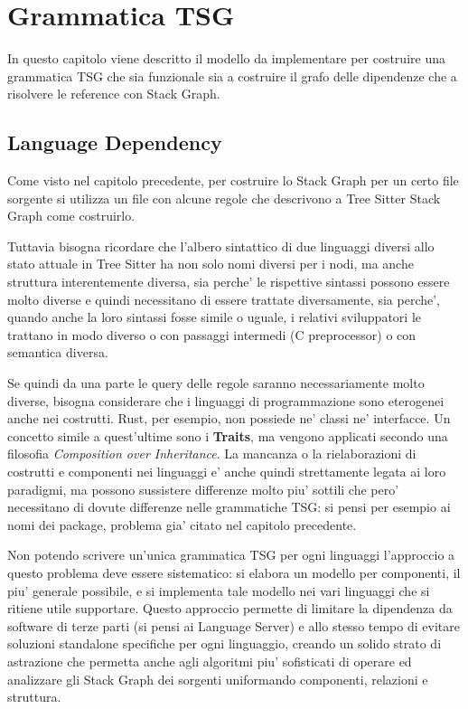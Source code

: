\chapter{Grammatica TSG}

In questo capitolo viene descritto il modello da implementare per costruire una grammatica TSG che sia funzionale sia a costruire il grafo delle dipendenze che a risolvere le reference con Stack Graph.

\section{Language Dependency}

Come visto nel capitolo precedente, per costruire lo Stack Graph per un certo file sorgente si utilizza un file con alcune regole che descrivono a Tree Sitter Stack Graph come costruirlo.

\par
Tuttavia bisogna ricordare che l'albero sintattico di due linguaggi diversi allo stato attuale in Tree Sitter ha non solo nomi diversi per i nodi, ma anche struttura interentemente diversa, sia perche' le rispettive sintassi possono essere molto diverse e quindi necessitano di essere trattate diversamente, sia perche', quando anche la loro sintassi fosse simile o uguale, i relativi sviluppatori le trattano in modo diverso o con passaggi intermedi (C preprocessor) o con semantica diversa.

\par
Se quindi da una parte le query delle regole saranno necessariamente molto diverse, bisogna considerare che i linguaggi di programmazione sono eterogenei anche nei costrutti.
Rust, per esempio, non possiede ne' classi ne' interfacce. Un concetto simile a quest'ultime sono i \textbf{Traits}, ma vengono applicati secondo una filosofia \emph{Composition over Inheritance}.
La mancanza o la rielaborazioni di costrutti e componenti nei linguaggi e' anche quindi strettamente legata ai loro paradigmi, ma possono sussistere differenze molto piu' sottili che pero' necessitano di dovute differenze nelle grammatiche TSG: si pensi per esempio ai nomi dei package, problema gia' citato nel capitolo precedente.

\par
Non potendo scrivere un'unica grammatica TSG per ogni linguaggi l'approccio a questo problema deve essere sistematico: si elabora un modello per componenti, il piu' generale possibile, e si implementa tale modello nei vari linguaggi che si ritiene utile supportare.
Questo approccio permette di limitare la dipendenza da software di terze parti (si pensi ai Language Server) e allo stesso tempo di evitare soluzioni standalone specifiche per ogni linguaggio, creando un solido strato di astrazione che permetta anche agli algoritmi piu' sofisticati di operare ed analizzare gli Stack Graph dei sorgenti uniformando componenti, relazioni e struttura.

